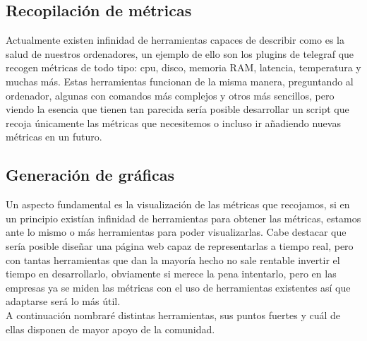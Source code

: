 \documentclass[ spanish, a4paper, 12pt, oneside]{report}
\begin{document}
\subsection{Recopilación de métricas}
Actualmente existen infinidad de herramientas capaces de describir como es la salud de nuestros ordenadores, un ejemplo de ello son los plugins de telegraf que recogen métricas de todo tipo: cpu, disco, 
memoria RAM, latencia, temperatura y muchas más. Estas herramientas funcionan de la misma manera, preguntando al ordenador, algunas con comandos más complejos y otros más sencillos, pero viendo la esencia 
que tienen tan parecida sería posible desarrollar un script que recoja únicamente las métricas que necesitemos o incluso ir añadiendo nuevas métricas en un futuro.\\

\subsection{Generación de gráficas}
Un aspecto fundamental es la visualización de las métricas que recojamos, si en un principio existían infinidad de herramientas para obtener las métricas, estamos ante lo mismo o más herramientas para poder visualizarlas. Cabe destacar que sería posible 
diseñar una página web capaz de representarlas a tiempo real, pero con tantas herramientas que dan la mayoría hecho no sale rentable invertir el tiempo en desarrollarlo, obviamente 
si merece la pena intentarlo, pero en las empresas ya se miden las métricas con el uso de herramientas existentes así que adaptarse será lo más útil.\\

A continuación nombraré distintas herramientas, sus puntos fuertes y cuál de ellas disponen de mayor apoyo de la comunidad.
\end{document}

